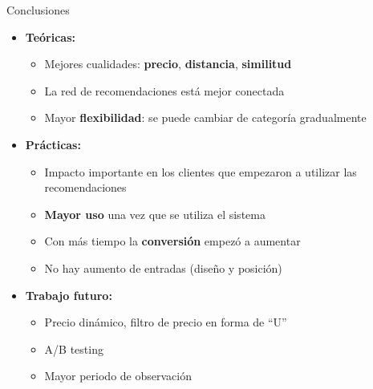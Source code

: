 \documentclass{beamer}
\begin{document}
\begin{frame}{Conclusiones}
	\begin{itemize}
		\item \textbf{Teóricas:}
		\begin{itemize}
			\item Mejores cualidades: \textbf{precio}, \textbf{distancia}, \textbf{similitud}
			\item La red de recomendaciones está mejor conectada
			\item Mayor \textbf{flexibilidad}: se puede cambiar de categoría gradualmente
		\end{itemize}
		\item \textbf{Prácticas:}
		\begin{itemize}
			\item Impacto importante en los clientes que empezaron a utilizar las recomendaciones
			\item \textbf{Mayor uso} una vez que se utiliza el sistema
			\item Con más tiempo la \textbf{conversión} empezó a aumentar
			\item No hay aumento de entradas (diseño y posición)
		\end{itemize}
		\item \textbf{Trabajo futuro:}
		\begin{itemize}
			\item Precio dinámico, filtro de precio en forma de ``U''
			\item A/B testing
			\item Mayor periodo de observación
		\end{itemize}
	\end{itemize}
\end{frame}
\end{document}
